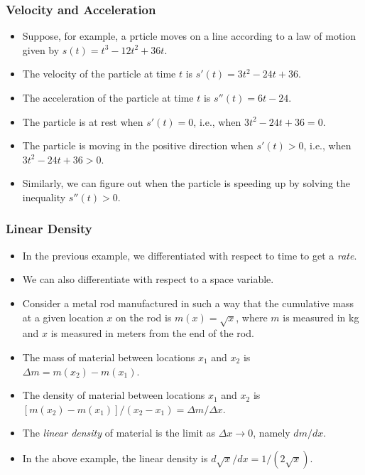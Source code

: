 \documentclass[serif,ignorenonframetext]{beamer}
\begin{document}
\begin{frame}
  \frametitle{Velocity and Acceleration}
  \begin{itemize}[<+->]
  \item Suppose, for example, a prticle moves on a line according to a law
    of motion given by $s(t)=t^3-12t^2+36t$.
  \item The velocity of the particle at time $t$ is $s'(t)=3t^2-24t+36$.
  \item The acceleration of the particle at time $t$ is $s''(t)=6t-24$.
  \item The particle is at rest when $s'(t)=0$, i.e., when $3t^2-24t+36=0$.
  \item The particle is moving in the positive direction when $s'(t)>0$, i.e.,
    when $3t^2-24t+36 > 0$.
  \item Similarly, we can figure out when the particle is speeding up by
    solving the inequality $s''(t)>0$.
  \end{itemize}
\end{frame}

\begin{frame}
  \frametitle{Linear Density}
  \begin{itemize}[<+->]
  \item In the previous example, we differentiated with respect to time
    to get a \textit{rate}.
  \item We can also differentiate with respect to a space variable.
  \item Consider a metal rod manufactured in such a way that the 
    cumulative mass at a given location $x$ on the rod
    is $m(x)=\sqrt{x}$, where $m$ is measured in kg and $x$ is measured
    in meters from the end of the rod.
  \item The mass of material between locations $x_1$ and $x_2$ 
    is $\Delta m = m(x_2)-m(x_1)$.
  \item The density of material between locations $x_1$ and $x_2$ is
    $[m(x_2)-m(x_1)]/(x_2-x_1)=\Delta m/\Delta x$.
  \item The \textit{linear density} of material is the limit as 
    $\Delta x\to 0$, namely $dm/dx$.
  \item In the above example, the linear density is $d\sqrt{x}/dx
    = 1/(2\sqrt{x})$.
  \end{itemize}
\end{frame}
\end{document}
